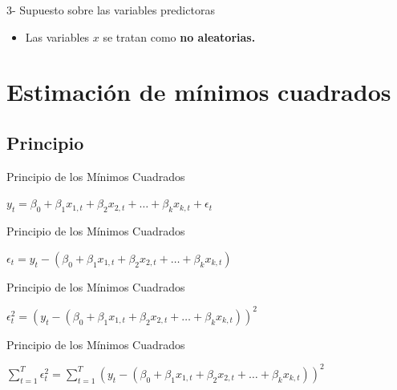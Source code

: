 \documentclass[11pt]{beamer}
\begin{document}
\begin{frame}{3- Supuesto sobre las variables predictoras}
	\begin{block}{}
		\begin{itemize}
			\item Las variables $x$ se tratan como \textbf{no aleatorias.} 
		\end{itemize}
	\end{block}
\end{frame}

\section{Estimación de mínimos cuadrados}
\begin{frame}
	\tableofcontents[currentsection] %
\end{frame}
\subsection{Principio}
\begin{frame}{Principio de los Mínimos Cuadrados}
	\begin{block}{}
	\centering
	 $y_t = \beta_0 + \beta_1 x_{1,t} + \beta_2 x_{2,t} + \dots + \beta_k x_{k,t} + \epsilon_t$
	\end{block}

\end{frame}

\begin{frame}{Principio de los Mínimos Cuadrados}
	\begin{block}{}
	\centering
	 $\epsilon_t = y_t-(\beta_0 + \beta_1 x_{1,t} + \beta_2 x_{2,t} + \dots + \beta_k x_{k,t} )$
	\end{block}

\end{frame}

\begin{frame}{Principio de los Mínimos Cuadrados}
	\begin{block}{}
	\centering
	 $\epsilon_t^2 = (y_t-(\beta_0 + \beta_1 x_{1,t} + \beta_2 x_{2,t} + \dots + \beta_k x_{k,t} ))^2$
	\end{block}

\end{frame}

\begin{frame}{Principio de los Mínimos Cuadrados}
	\begin{block}{}
	\centering
	 $\sum_{t=1}^{T} \epsilon_t^2 = \sum_{t=1}^{T} (y_t-(\beta_0 + \beta_1 x_{1,t} + \beta_2 x_{2,t} + \dots + \beta_k x_{k,t} ))^2$
	\end{block}
	
\end{frame}
\end{document}
